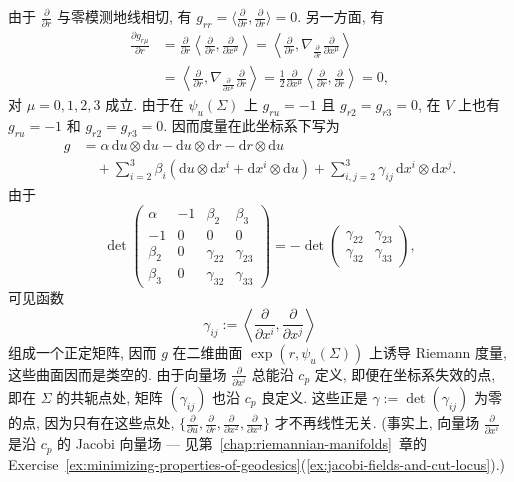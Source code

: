 由于 $\frac{\partial}{\partial r}$ 与零模测地线相切, 有 $g_{rr}=\langle\frac{\partial}{\partial r},\frac{\partial}{\partial r}\rangle=0$. 另一方面, 有
\begin{align*}
  \frac{\partial g_{r\mu}}{\partial r}
  &=\frac{\partial}{\partial r}\left\langle\frac{\partial}{\partial r},
                   \frac{\partial}{\partial x^\mu}\right\rangle
   =\left\langle\frac{\partial}{\partial r},
       \nabla_{\frac{\partial}{\partial r}}\frac{\partial}{\partial x^\mu}\right\rangle\\
  &=\left\langle\frac{\partial}{\partial r},
       \nabla_{\frac{\partial}{\partial x^\mu}}\frac{\partial}{\partial r}\right\rangle
   =\frac12\frac{\partial}{\partial x^\mu}
          \left\langle\frac{\partial}{\partial r},\frac{\partial}{\partial r}\right\rangle=0,
\end{align*}
对 $\mu=0,1,2,3$ 成立. 由于在 $\psi_u(\Sigma)$ 上 $g_{ru}=-1$ 且 $g_{r2}=g_{r3}=0$, 在 $V$ 上也有 $g_{ru}=-1$ 和 $g_{r2}=g_{r3}=0$. 因而度量在此坐标系下写为
\begin{align*}
  g&=\alpha\,\mathrm{d}u\otimes\mathrm{d}u-\mathrm{d}u\otimes\mathrm{d}r
       -\mathrm{d}r\otimes\mathrm{d}u\\
   &\quad+\sum_{i=2}^3\beta_i(\mathrm{d}u\otimes\mathrm{d}x^i+\mathrm{d}x^i\otimes\mathrm{d}u)
       +\sum_{i,j=2}^3\gamma_{ij}\,\mathrm{d}x^i\otimes\mathrm{d}x^j.
\end{align*}
由于
\[
  \det\begin{pmatrix}
    \alpha & -1 & \beta_2 & \beta_3\\
    -1 & 0 & 0 & 0\\
    \beta_2 & 0 & \gamma_{22} & \gamma_{23}\\
    \beta_3 & 0 & \gamma_{32} & \gamma_{33}
  \end{pmatrix}
  =-\det\begin{pmatrix}
    \gamma_{22} & \gamma_{23}\\
    \gamma_{32} & \gamma_{33}
  \end{pmatrix},
\]
可见函数
\[
  \gamma_{ij}:=\left\langle\frac{\partial}{\partial x^i},\frac{\partial}{\partial x^j}\right\rangle
\]
组成一个正定矩阵, 因而 $g$ 在二维曲面 $\exp(r,\psi_u(\Sigma))$ 上诱导 Riemann 度量, 这些曲面因而是类空的. 由于向量场 $\frac{\partial}{\partial x^i}$ 总能沿 $c_p$ 定义, 即便在坐标系失效的点, 即在 $\Sigma$ 的共轭点处, 矩阵 $(\gamma_{ij})$ 也沿 $c_p$ 良定义. 这些正是 $\gamma:=\det(\gamma_{ij})$ 为零的点, 因为只有在这些点处, $\{\frac{\partial}{\partial u},\frac{\partial}{\partial r},\frac{\partial}{\partial x^2},\frac{\partial}{\partial x^3}\}$ 才不再线性无关. (事实上, 向量场 $\frac{\partial}{\partial x^i}$ 是沿 $c_p$ 的 Jacobi 向量场 --- 见第~\ref{chap:riemannian-manifolds}~章的 Exercise~\ref{ex:minimizing-properties-of-geodesics}(\ref{ex:jacobi-fields-and-cut-locus}).)

